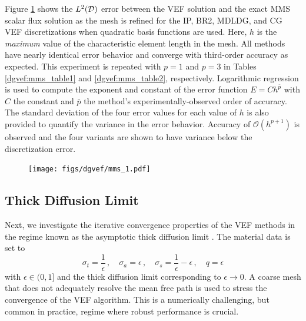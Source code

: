 \documentclass[../doc.tex]{subfiles}
\begin{document}
Figure \ref{dgvef:mms_plot} shows the $L^2(\mathcal{D})$ error between the VEF solution and the exact MMS scalar flux solution as the mesh is refined for the IP, BR2, MDLDG, and CG VEF discretizations when quadratic basis functions are used. Here, $h$ is the \emph{maximum} value of the characteristic element length in the mesh. All methods have nearly identical error behavior and converge with third-order accuracy as expected. This experiment is repeated with $p=1$ and $p=3$ in Tables \ref{dgvef:mms_table1} and \ref{dgvef:mms_table2}, respectively. Logarithmic regression is used to compute the exponent and constant of the error function $E = C h^{\bar{p}}$ with $C$ the constant and $\bar{p}$ the method's experimentally-observed order of accuracy. The standard deviation of the four error values for each value of $h$ is also provided to quantify the variance in the error behavior. Accuracy of $\mathcal{O}(h^{p+1})$ is observed and the four variants are shown to have variance below the discretization error. 

\begin{table}
\centering
\caption{}
\label{dgvef:mms_table1}

\end{table}

\begin{table}
\centering
\caption{}
\label{dgvef:mms_table2}

\end{table}

\begin{figure}
\centering
\texttt{[image: figs/dgvef/mms\_1.pdf]}
\caption{}
\label{dgvef:mms_plot}
\end{figure}

\subsection{Thick Diffusion Limit}
Next, we investigate the iterative convergence properties of the VEF methods in the regime known as the asymptotic thick diffusion limit \cite{diflim}. The material data is set to 
	\begin{equation}
		\sigma_t = \frac{1}{\epsilon} \,, \quad \sigma_a = \epsilon \,, \quad \sigma_s = \frac{1}{\epsilon} - \epsilon \,, \quad q = \epsilon 
	\end{equation}
with $\epsilon \in (0,1]$ and the thick diffusion limit corresponding to $\epsilon \rightarrow 0$. A coarse mesh that does not adequately resolve the mean free path is used to stress the convergence of the VEF algorithm. This is a numerically challenging, but common in practice, regime where robust performance is crucial. 
\end{document}
